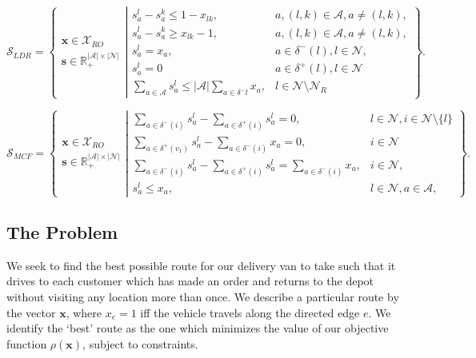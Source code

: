 \begin{equation}
\label{def:domain_sldr}
\mathcal{S}_{LDR} = \left\{
\left. \begin{array}{l} \mathbf{x} \in \mathcal{X}_{RO} \\\mathbf{s} \in \mathbb{R}_+^{|\mathcal{A}|\times |\mathcal{N}|} \end{array} \right.  \left\vert
\begin{array}{ll}
s^l_a - s^k_a \leq 1-x_{lk}, & a, (l,k) \in \mathcal{A}, a \neq (l,k), \\
s^l_a - s^k_a \geq x_{lk}-1, & a, (l,k) \in \mathcal{A}, a \neq (l,k), \\
s^l_a = x_a, & a \in \delta^-(l), l \in \mathcal{N},\\
s^l_a =0 & a \in \delta^+(l), l \in \mathcal{N}\\
\sum \limits_{a \in \mathcal{A}} s^l_a \leq |\mathcal{A}| \sum \limits_{a \in \delta^-{l}} x_a,& l \in \mathcal{N} \setminus \mathcal{N}_R
\end{array}\right. \right\}.
\end{equation}

\begin{equation}
\label{def:domain_smcf}
\mathcal{S}_{MCF} = \left\{
\left. \begin{array}{l} \mathbf{x} \in \mathcal{X}_{RO} \\\mathbf{s} \in \mathbb{R}_+^{|\mathcal{A}|\times |\mathcal{N}|} \end{array} \right.  \left\vert
\begin{array}{ll}
\sum \limits_{a \in \delta^-(i)}s^l_a - \sum \limits_{a \in \delta^+(i)} s^l_a = 0, & l \in \mathcal{N}, i \in \mathcal{N}\setminus\{l\}\\
\sum \limits_{a \in \delta^+(v_1)}s^l_a - \sum \limits_{a \in \delta^-(i)} x_a = 0, & i \in \mathcal{N}\\
\sum \limits_{a \in \delta^-(i)}s^l_a - \sum \limits_{a \in \delta^+(i)} s^l_a = \sum \limits_{a \in \delta^-(i)} x_a, &  i \in \mathcal{N},\\
s^l_a \leq x_a, & l \in \mathcal{N}, a \in \mathcal{A},
\end{array}\right. \right\}.
\end{equation}

\subsection{The Problem}
We seek to find the best possible route for our delivery van to take such that it drives to each customer which has made an order and returns to the depot without visiting any location more than once. We describe a particular route by the vector $\mathbf{x}$, where $x_{e} = 1$ iff the vehicle travels along the directed edge $e$. We identify the `best' route as the one which minimizes the value of our objective function $\rho(\mathbf{x})$, subject to constraints. 

